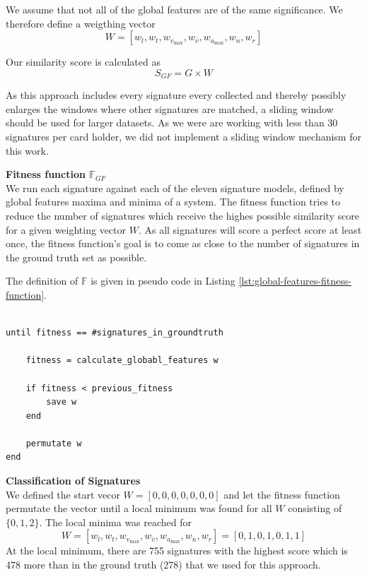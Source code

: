\documentclass[a4paper, oneside]{csthesis}
\begin{document}
We assume that not all of the global features are of the same significance. We therefore define a  weigthing vector $$W = [w_l, w_t, w_{v_\text{max}}, w_{\bar{v}}, w_{a_\text{max}}, w_n, w_r]$$

Our similarity score is calculated as
$$S_{GF} = G \times W$$

As this approach includes every signature every collected and thereby possibly enlarges the windows where other signatures are matched, a sliding window should be used for larger datasets. As we were are working with less than 30 signatures per card holder, we did not implement a sliding window mechanism for this work.

\noindent\textbf{Fitness function $\mathbb{F}_{GF}$}\\
We run each signature against each of the eleven signature models, defined by global features maxima and minima of a system. The fitness function tries to reduce the number of signatures which receive the highes possible similarity score for a given weighting vector $W$.
As all signatures will score a perfect score at least once, the fitness function's goal is to come as close to the number of signatures in the ground truth set as possible.

The definition of $\mathbb{F}$ is given in pseudo code in Listing \ref{lst:global-features-fitness-function}.


\begin{lstlisting}[caption={The fitness function for global features tries to reduce the number of signatures with the hightes possible score for a given weighting vector $W$},label={lst:global-features-fitness-function}]

until fitness == #signatures_in_groundtruth

    fitness = calculate_globabl_features w

    if fitness < previous_fitness
        save w
    end

    permutate w
end
\end{lstlisting}


\noindent\textbf{Classification of Signatures}\\
We defined the start vecor $W = [0,0,0,0,0,0,0]$ and let the fitness function permutate the vector until a local minimum was found for all $W$ consisting of $\{0,1,2\}$. The local minima was reached for $$W = [w_l, w_t, w_{v_\text{max}}, w_{\bar{v}}, w_{a_\text{max}}, w_n, w_r] = [0, 1, 0, 1, 0, 1, 1]$$
At the local minimum, there are 755 signatures with the highest score which is 478 more than in the ground truth (278) that we used for this approach.
\end{document}
